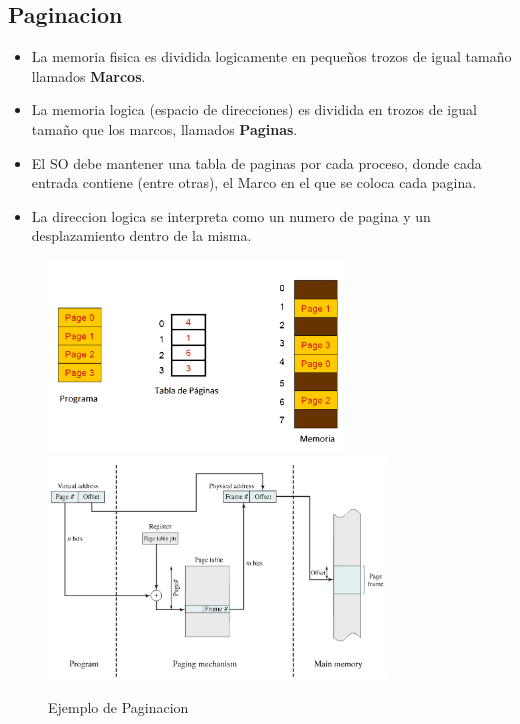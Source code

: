 \subsection{Paginacion}
\begin{itemize}
    \item La memoria fisica es dividida logicamente en pequeños trozos de igual tamaño llamados \textbf{Marcos}.
    \item La memoria logica (espacio de direcciones) es dividida en trozos de igual tamaño que los marcos, llamados \textbf{Paginas}.
    \item El SO debe mantener una tabla de paginas por cada proceso, donde cada entrada contiene (entre otras), el Marco en el que se coloca cada pagina.
    \item La direccion logica se interpreta como un numero de pagina y un desplazamiento dentro de la misma.
\end{itemize}
\begin{figure}[h]
    \begin{center}
        \includegraphics[width=0.70\textwidth]{assets/Paging.pdf}
        \includegraphics[width=0.80\textwidth]{assets/PagingTraslation.pdf}
    \end{center}
    \caption{Ejemplo de Paginacion}\label{fig:}
\end{figure}

